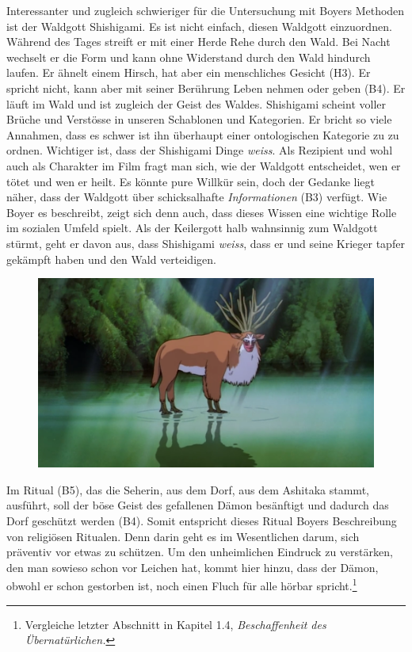Interessanter und zugleich schwieriger für die Untersuchung mit Boyers Me\-thoden ist der Waldgott Shishigami. Es ist nicht einfach, diesen Waldgott ein\-zuordnen. Während des Tages streift er mit einer Herde Rehe durch den Wald. Bei Nacht wechselt er die Form und kann ohne Widerstand durch den Wald hindurch laufen. Er ähnelt einem Hirsch, hat aber ein menschliches Gesicht (H3). Er spricht nicht, kann aber mit seiner Berührung Leben nehmen oder geben (B4). Er läuft im Wald und ist zugleich der Geist des Waldes. Shishigami scheint voller Brüche und Verstösse in unseren Schablonen und Kategorien. Er bricht so viele Annahmen, dass es schwer ist ihn überhaupt einer ontologischen Kategorie zu zu ordnen. Wichtiger ist, dass der Shishigami Dinge \emph{weiss}. Als Rezipient und wohl auch als Charakter im Film fragt man sich, wie der Waldgott entscheidet, wen er tötet und wen er heilt. Es könnte pure Willkür sein, doch der Gedanke liegt näher, dass der Waldgott über schicksalhafte \emph{Informationen} (B3) verfügt. Wie Boyer es beschreibt, zeigt sich denn auch, dass dieses Wissen eine wichtige Rolle im sozialen Umfeld spielt. Als der Keilergott halb wahnsinnig zum Waldgott stürmt, geht er davon aus, dass Shishigami \emph{weiss}, dass er und seine Krieger tapfer gekämpft haben und den Wald verteidigen. 

\begin{figure}
  \centering
  \includegraphics[width=.8\linewidth]{images/01-09-38_mononoke.png}
  \label{fig:test2}
\end{figure}

Im Ritual (B5), das die Seherin, aus dem Dorf, aus dem Ashitaka stammt, ausführt, soll der böse Geist des gefallenen Dämon besänftigt und dadurch das Dorf geschützt werden (B4). Somit entspricht dieses Ritual Boyers Beschreibung von religiösen Ritualen. Denn darin geht es im Wesentlichen darum, sich präventiv vor etwas zu schützen. Um den unheimlichen Eindruck zu verstärken, den man sowieso schon vor Leichen hat, kommt hier hinzu, dass der Dämon, obwohl er schon gestorben ist, noch einen Fluch für alle hörbar spricht.\footnote{Vergleiche letzter Abschnitt in Kapitel 1.4, \emph{Beschaffenheit des Übernatürlichen.}}

